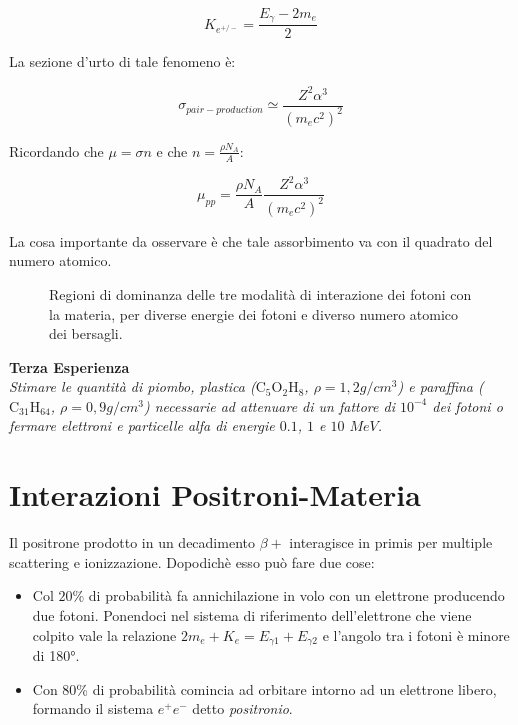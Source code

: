 \documentclass [a4paper, twoside] {book}
\begin{document}
\begin{equation}
K_{e^{+/-}}=\frac{E_{\gamma}-2m_e}{2}
\end{equation}

La sezione d'urto di tale fenomeno è:

\begin{equation}
\sigma_{pair-production}\simeq\frac{Z^2\alpha^3}{(m_ec^2)^2}
\end{equation}

Ricordando che $\mu=\sigma n$ e che $n=\frac{\rho N_A}{A}$:

\begin{equation}
\mu_{pp}=\frac{\rho N_A}{A}\frac{Z^2\alpha^3}{(m_ec^2)^2}
\end{equation}

La cosa importante da osservare è che tale assorbimento va con il quadrato del numero atomico.\\

\begin{figure} []
\centering
		\caption{Regioni di dominanza delle tre modalità di interazione dei fotoni con la materia, per diverse energie dei fotoni e diverso numero atomico dei bersagli.}
         \label{crosssection}
\end{figure}



\textbf{Terza Esperienza}\\

\emph{Stimare le quantità di piombo, plastica ($\text{C}_5\text{O}_2\text{H}_8$, $\rho=1,2 g/cm^3$) e paraffina ($\text{C}_{31}\text{H}_{64}$, $\rho=0,9 g/cm^3$) necessarie ad attenuare di un fattore di $10^{-4}$ dei fotoni o fermare elettroni e particelle alfa di energie $0.1$, $1$ e $10$ $MeV$.}

\section{Interazioni Positroni-Materia}

Il positrone prodotto in un decadimento $\beta+$ interagisce in primis per multiple scattering e ionizzazione. Dopodichè esso può fare due cose:

\begin{itemize}
\item Col $20\%$ di probabilità fa annichilazione in volo con un elettrone producendo due fotoni. Ponendoci nel sistema di riferimento dell'elettrone che viene colpito vale la relazione $2m_e+K_e=E_{\gamma1}+E_{\gamma2}$ e l'angolo tra i fotoni è minore di \ang{180}.
\item Con 80\% di probabilità comincia ad orbitare intorno ad un elettrone libero, formando il sistema $e^+e^-$ detto \emph{positronio}.
\end{itemize}
\end{document}
